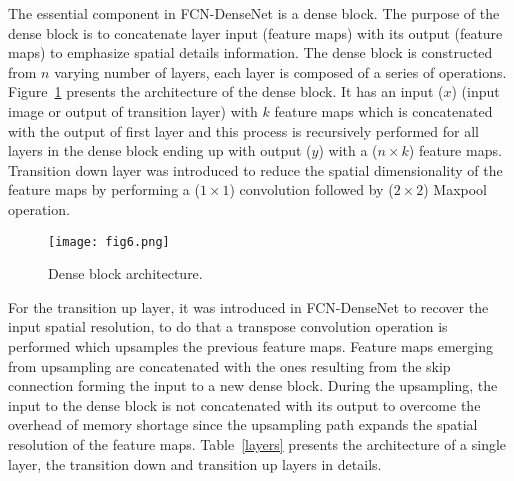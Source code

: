 	The essential component in FCN-DenseNet is a dense block.
	The purpose of the dense block is to concatenate layer input (feature maps) with its output (feature maps) to emphasize spatial details information.
	The dense block is constructed from \(n\) varying number of layers, each layer is composed of a series of operations.
	Figure~\ref{dense_block} presents the architecture of the dense block.
	It has an input (\(x\)) (input image or output of transition layer) with \(k\) feature maps which is concatenated with the output of first layer and this process is recursively performed for all layers in the dense block ending up with output (\(y\)) with a (\(n\times k\)) feature maps. 
	Transition down layer was introduced to reduce the spatial dimensionality of the feature maps by performing a (\(1\times 1\)) convolution followed by (\(2\times2\)) Maxpool operation. 

	\begin{figure} [h!]
		\begin{center}
			\texttt{[image: fig6.png]}
		\end{center}
		\caption{Dense block architecture.} 
		\label{dense_block}
	\end{figure}

	For the transition up layer, it was introduced in FCN-DenseNet to recover the input spatial resolution, to do that a transpose convolution operation is performed which upsamples the previous feature maps.
	Feature maps emerging from upsampling are concatenated with the ones resulting from the skip connection forming the input to a new dense block.
	During the upsampling, the input to the dense block is not concatenated with its output to overcome the overhead of memory shortage since the upsampling path expands the spatial resolution of the feature maps.
	Table~\ref{layers} presents the architecture of a single layer, the transition down  and transition up layers in details.


